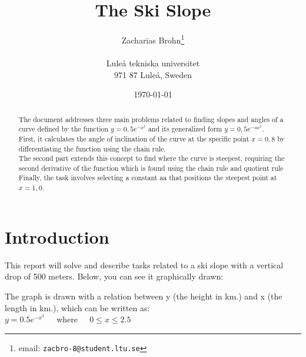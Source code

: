 \documentclass[a4paper,12pt]{article}
\title{The Ski Slope}
\author{Zacharias Brohn\thanks{email:
    \texttt{zacbro-8@student.ltu.se}}\\  
    ~ \\
    Luleå tekniska universitet \\ 
    971 87 Luleå, Sweden}
\date{\today}
\begin{document}
\linenumbers %

\maketitle

\begin{abstract}
    The document addresses three main problems related to finding slopes and 
    angles of a curve defined by the function $y = 0,5e^{-x^2}$ and its 
    generalized form $y = 0,5e^{-ax^2}$. \\
  
    First, it calculates the angle of inclination of the curve at the specific 
    point $x = 0,8$ by differentiating the function using the chain rule. \\

    The second part extends this concept to find where the curve is steepest, 
    requiring the second derivative of the function which is found using the 
    chain rule and quotient rule \\

    Finally, the task involves selecting a constant aa that positions the 
    steepest point at $x = 1,0$.
\end{abstract}
\newpage
\section{Introduction}
\label{sec:introduktion}
This report will solve and describe tasks related to a ski slope with a 
vertical drop of 500 meters. Below, you can see it graphically drawn:

\noindent
{}\newline
The graph is drawn with a relation between y (the height in km.) and x (the 
length in km.), which can be written as:\\ %
$y = 0.5e^{-x^2}$ $\>$ $\>$ where $\>$ $\>$ $0 \leq x \leq 2.5$\\ %
\end{document}
